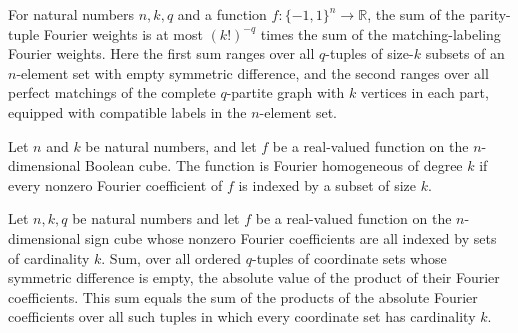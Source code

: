 \begin{theorem}
\label{FABL.parityTuple_sum_le_matchingLabeling_sum}
\leanok
{}
For natural numbers $n,k,q$ and a function $f:\{-1,1\}^n\to\mathbb{R}$, the sum of the
parity-tuple Fourier weights is at most $(k!)^{-q}$ times the sum of the
matching-labeling Fourier weights. Here the first sum ranges over all $q$-tuples of
size-$k$ subsets of an $n$-element set with empty symmetric difference, and the second
ranges over all perfect matchings of the complete $q$-partite graph with $k$ vertices in
each part, equipped with compatible labels in the $n$-element set.
\end{theorem}

\begin{definition}
\label{FABL.IsFourierHomogeneous}
\leanok
{}
Let $n$ and $k$ be natural numbers, and let $f$ be a real-valued function on the
$n$-dimensional Boolean cube. The function is Fourier homogeneous of degree $k$ if every
nonzero Fourier coefficient of $f$ is indexed by a subset of size $k$.
\end{definition}

\begin{theorem}
\label{FABL.sum_abs_fourierCoeff_tupleSymmDiff_eq_parityTuple_sum}
\leanok
{}
Let $n,k,q$ be natural numbers and let $f$ be a real-valued function on the
$n$-dimensional sign cube whose nonzero Fourier coefficients are all indexed by sets of
cardinality $k$. Sum, over all ordered $q$-tuples of coordinate sets whose symmetric
difference is empty, the absolute value of the product of their Fourier coefficients.
This sum equals the sum of the products of the absolute Fourier coefficients over all
such tuples in which every coordinate set has cardinality $k$.
\end{theorem}

